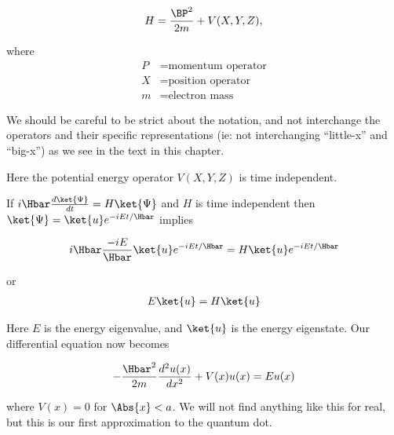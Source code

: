 {\begin{equation}\label{eqn:PHY356Lecture9:3}
\begin{aligned}
H = \frac{\BP^2}{2m} + V(X,Y,Z),
\end{aligned}
\end{equation}

where
\begin{equation}\label{eqn:lecture9boundStates:60}
\begin{aligned}
P &= \text{momentum operator} \\
X &= \text{position operator} \\
m &= \text{electron mass}
\end{aligned}
\end{equation}

We should be careful to be strict about the notation, and not interchange the operators and their specific representations (ie: not interchanging ``little-x'' and ``big-x'') as we see in the text in this chapter.

Here the potential energy operator \(V(X,Y,Z)\) is time independent.

If \(i \Hbar \frac{d\ket{\Psi}}{dt} = H \ket{\Psi}\) and \(H\) is time independent then \(\ket{\Psi} = \ket{u} e^{-i E t/\Hbar}\) implies

\begin{equation}\label{eqn:lecture9boundStates:80}
\begin{aligned}
i \Hbar \frac{ -i E }{\Hbar} \ket{u} e^{-i E t/\Hbar} = H \ket{u} e^{-i E t/\Hbar}
\end{aligned}
\end{equation}

or
\begin{equation}\label{eqn:PHY356Lecture9:4}
\begin{aligned}
E \ket{u} = H \ket{u}
\end{aligned}
\end{equation}

Here \(E\) is the energy eigenvalue, and \(\ket{u}\) is the energy eigenstate.  Our differential equation now becomes

\begin{equation}\label{eqn:PHY356Lecture9:5}
\begin{aligned}
-\frac{\Hbar^2 }{2m} \frac{d^2 u(x)}{dx^2} + V(x) u(x) = E u(x)
\end{aligned}
\end{equation}

where \(V(x) = 0\) for \(\Abs{x} < a\).  We will not find anything like this for real, but this is our first approximation to the quantum dot.

}
